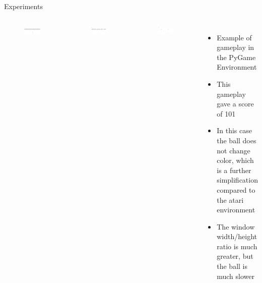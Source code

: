 \begin{frame}{Experiments}
    \begin{columns}[c,onlytextwidth]
            \begin{figure}
                \includegraphics[width=\textwidth]{images/pygame-sequence-0.png}
            \end{figure}
            \begin{figure}
                \includegraphics[width=\textwidth]{images/pygame-sequence-1.png}
            \end{figure}
            \begin{figure}
                \includegraphics[width=\textwidth]{images/pygame-sequence-2.png}
            \end{figure}
	    \begin{itemize}
		\item Example of gameplay in the PyGame Environment
		\item This gameplay gave a score of 101
		\item In this case the ball does not change color, which is a further simplification compared to the atari environment
		\item The window width/height ratio is much greater, but the ball is much slower
	    \end{itemize}
    \end{columns}
\end{frame}

